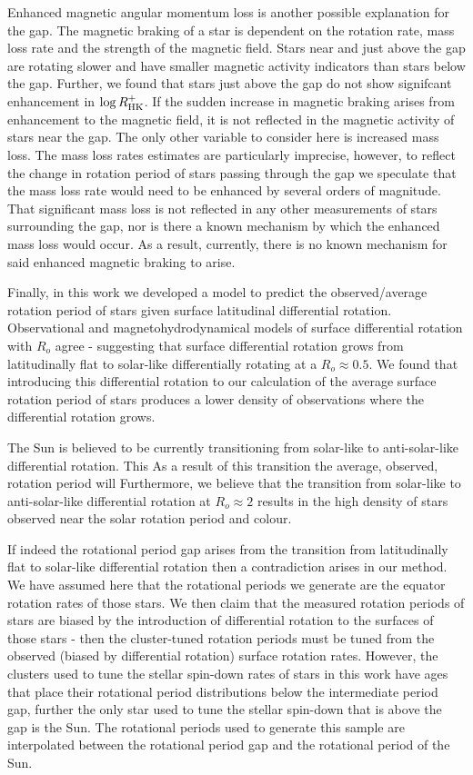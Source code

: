 Enhanced magnetic angular momentum loss is another possible explanation for the gap.
The magnetic braking of a star is dependent on the rotation rate, mass loss rate and the strength of the magnetic field.
Stars near and just above the gap are rotating slower and have smaller magnetic activity indicators than stars below the gap.
Further, we found that stars just above the gap do not show signifcant enhancement in  $\log R^{+}_{\rm{HK}}$.
If the sudden increase in magnetic braking arises from enhancement to the magnetic field, it is not reflected in the magnetic activity of stars near the gap.
The only other variable to consider here is increased mass loss.
The mass loss rates estimates are particularly imprecise, however, to reflect the change in rotation period of stars passing through the gap we speculate that the mass loss rate would need to be enhanced by several orders of magnitude. 
That significant mass loss is not reflected in any other measurements of stars surrounding the gap, nor is there a known mechanism by which the enhanced mass loss would occur.
As a result, currently, there is no known mechanism for said enhanced magnetic braking to arise.

Finally, in this work we developed a model to predict the observed/average rotation period of stars given surface latitudinal differential rotation.
Observational and magnetohydrodynamical models of surface differential rotation with $R_o$ agree - suggesting that surface differential rotation grows from latitudinally flat to solar-like differentially rotating at a $R_o \approx 0.5$.
We found that introducing this differential rotation to our calculation of the average surface rotation period of stars produces a lower density of observations where the differential rotation grows.

The Sun is believed to be currently transitioning from solar-like to anti-solar-like differential rotation.
This
As a result of this transition the average, observed, rotation period will 
Furthermore, we believe that the transition from solar-like to anti-solar-like differential rotation at $R_o \approx 2$ results in the high density of stars observed near the solar rotation period and colour.

 
 
If indeed the rotational period gap arises from the transition from latitudinally flat to solar-like differential rotation then a contradiction arises in our method.
We have assumed here that the rotational periods we generate are the equator rotation rates of those stars.
We then claim that the measured rotation periods of stars are biased by the introduction of differential rotation to the surfaces of those stars - then the cluster-tuned rotation periods must be tuned from the observed (biased by differential rotation) surface rotation rates.
However, the clusters used to tune the stellar spin-down rates of stars in this work have ages that place their rotational period distributions below the intermediate period gap, further the only star used to tune the stellar spin-down that is above the gap is the Sun.
The rotational periods used to generate this sample are interpolated between the rotational period gap and the rotational period of the Sun.





